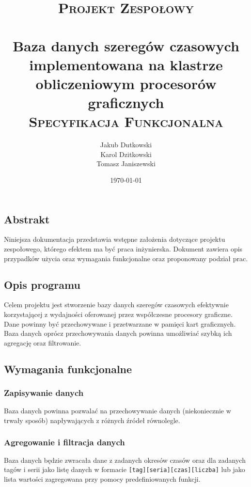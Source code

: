 \documentclass[paper=a4, fontsize=11pt]{scrartcl} %
\title{
\vspace*{\fill}
\normalfont
\textsc{Projekt Zespołowy}\\ [20pt]
\horrule{1.5pt} \\[0.4cm] %
\LARGE Baza danych szeregów czasowych implementowana na klastrze obliczeniowym procesorów graficznych
\horrule{1.5pt} \\[0.1cm] %
\normalsize
\textsc{Specyfikacja Funkcjonalna} \\ [20pt]
\vspace*{\fill}
}
\author{Jakub Dutkowski \\ Karol Dzitkowski \\ Tomasz Janiszewski } %
\date{\normalsize\today} %
\numberwithin{equation}{section} %
\numberwithin{figure}{section} %
\numberwithin{table}{section} %
\begin{document}
\maketitle

\thispagestyle{empty}
\clearpage

\tableofcontents
\listoffigures

\chapter{}

\clearpage

\vspace{4em}


\section{Abstrakt}
Niniejsza dokumentacja przedstawia wstępne założenia dotyczące projektu zespołowego, którego efektem ma być praca inżynierska.
Dokument zawiera opis przypadków użycia oraz wymagania funkcjonalne oraz proponowany podział prac.

\section{Opis programu}
Celem projektu jest stworzenie bazy danych szeregów czasowych efektywnie korzystającej z wydajności oferowanej przez współczesne
procesory graficzne. Dane powinny być przechowywane i przetwarzane w pamięci kart graficznych. Baza danych oprócz przechowywania
danych powinna umożliwiać szybką ich agregację oraz filtrowanie.

\section{Wymagania funkcjonalne}
    \subsection{Zapisywanie danych}
    Baza danych powinna pozwalać na przechowywanie danych (niekoniecznie w trwały sposób) napływających z różnych źródeł
    równolegle.
    \subsection{Agregowanie i filtracja danych }
    Baza danych będzie zwracała dane z zadanych okresów czasów oraz dla zadanych tagów i serii jako listę danych w
    formacie \texttt{[tag][seria][czas][liczba]} lub jako lista wartości zagregowana przy pomocy predefiniowanych funkcji.
\end{document}
